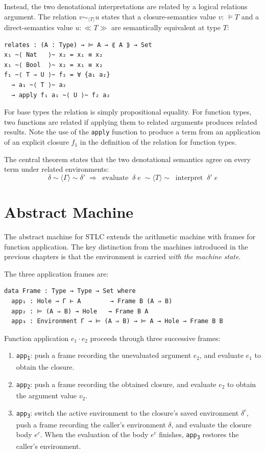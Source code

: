Instead, the two denotational interpretations are related by a logical relations argument.
The relation $v \sim_{\langle T \rangle} u$ states that a closure-semantics value $v : \ \vDash T$ and a
direct-semantics value $u : \ll T \gg$ are semantically equivalent at
type $T$:

\begin{verbatim}
relates : (A : Type) → ⊨ A → ⟪ A ⟫ → Set
x₁ ~⟨ Nat   ⟩~ x₂ = x₁ ≡ x₂
x₁ ~⟨ Bool  ⟩~ x₂ = x₁ ≡ x₂
f₁ ~⟨ T ⇒ U ⟩~ f₂ = ∀ {a₁ a₂}
  → a₁ ~⟨ T ⟩~ a₂ 
  → apply f₁ a₁ ~⟨ U ⟩~ f₂ a₂
\end{verbatim}

For base types the relation is simply propositional equality.
For function types, two functions are related if applying them to related arguments produces related results.
Note the use of the \texttt{apply} function to produce a term from an application of an explicit closure $f_1$ in the definition of the relation for function types.

The central theorem states that the two denotational semantics agree on every term under related environments:
\[
  \delta \sim\!\langle\Gamma\rangle\!\sim \delta'\;\Longrightarrow\;\operatorname{evaluate}\;\delta\;e\;\sim\!\langle T\rangle\!\sim\;\operatorname{interpret}\;\delta'\;e
\]

\section{Abstract Machine}

The abstract machine for STLC extends the arithmetic machine with frames for function
application.
The key distinction from the machines introduced in the previous chapters is that the environment is carried
\emph{with the machine state}.

The three application frames are:

\begin{verbatim}
data Frame : Type → Type → Set where
  app₁ : Hole → Γ ⊢ A        → Frame B (A ⇒ B)
  app₂ : ⊨ (A ⇒ B) → Hole   → Frame B A
  app₃ : Environment Γ → ⊨ (A ⇒ B) → ⊨ A → Hole → Frame B B
\end{verbatim}

Function application $e_1 \cdot e_2$ proceeds through three successive frames:
\begin{enumerate}
  \item \texttt{app\textsubscript{1}}: push a frame recording the unevaluated argument $e_2$,
    and evaluate $e_1$ to obtain the closure.
  \item \texttt{app\textsubscript{2}}: push a frame recording the obtained closure, and evaluate
    $e_2$ to obtain the argument value $v_2$.
  \item \texttt{app\textsubscript{3}}: switch the active environment to the closure's saved
    environment $\delta^c$, push a frame recording the caller's environment $\delta$,
    and evaluate the closure body $e^c$.
    When the evaluation of the body $e^c$ finishes, \texttt{app\textsubscript{3}} restores the caller's environment.
\end{enumerate}

